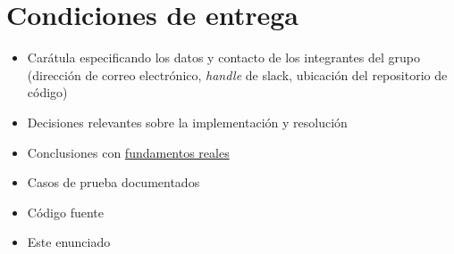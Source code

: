 \documentclass{article}
\begin{document}
\section{Condiciones de entrega}

\begin{itemize}
\item Carátula especificando los datos y contacto de los integrantes del grupo (dirección de correo electrónico, 
\textit{handle} de slack, ubicación del repositorio de código)
\item Decisiones relevantes sobre la implementación y resolución
\item Conclusiones con \underline{fundamentos reales}
\item Casos de prueba documentados
\item Código fuente
\item Este enunciado
\end{itemize}
\end{document}
